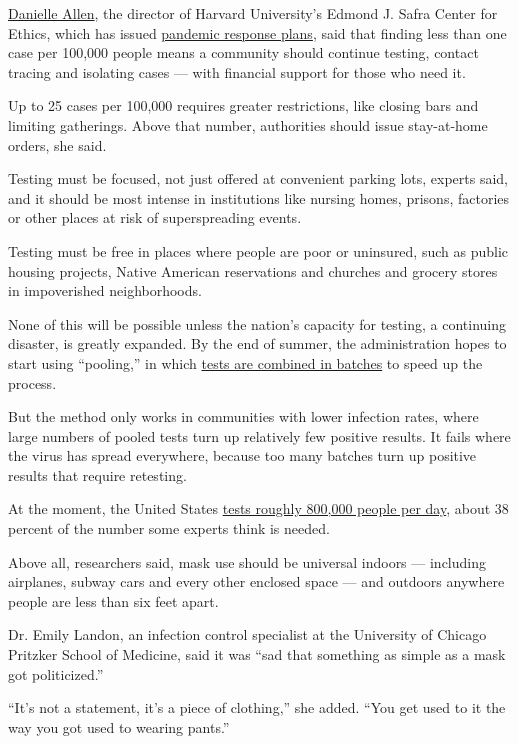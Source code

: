 \href{https://scholar.harvard.edu/danielleallen/home}{Danielle Allen},
the director of Harvard University's Edmond J. Safra Center for Ethics,
which has issued
\href{https://ethics.harvard.edu/news/path-zero-key-metrics}{pandemic
response plans}, said that finding less than one case per 100,000 people
means a community should continue testing, contact tracing and isolating
cases --- with financial support for those who need it.

Up to 25 cases per 100,000 requires greater restrictions, like closing
bars and limiting gatherings. Above that number, authorities should
issue stay-at-home orders, she said.

Testing must be focused, not just offered at convenient parking lots,
experts said, and it should be most intense in institutions like nursing
homes, prisons, factories or other places at risk of superspreading
events.

Testing must be free in places where people are poor or uninsured, such
as public housing projects, Native American reservations and churches
and grocery stores in impoverished neighborhoods.

None of this will be possible unless the nation's capacity for testing,
a continuing disaster, is greatly expanded. By the end of summer, the
administration hopes to start using ``pooling,'' in which
\href{https://www.nytimes.com/2020/07/01/health/coronavirus-pooled-testing.html}{tests
are combined in batches} to speed up the process.

But the method only works in communities with lower infection rates,
where large numbers of pooled tests turn up relatively few positive
results. It fails where the virus has spread everywhere, because too
many batches turn up positive results that require retesting.

At the moment, the United States
\href{https://www.nytimes.com/interactive/2020/us/coronavirus-testing.html}{tests
roughly 800,000 people per day}, about 38 percent of the number some
experts think is needed.

Above all, researchers said, mask use should be universal indoors ---
including airplanes, subway cars and every other enclosed space --- and
outdoors anywhere people are less than six feet apart.

Dr. Emily Landon, an infection control specialist at the University of
Chicago Pritzker School of Medicine, said it was ``sad that something as
simple as a mask got politicized.''

``It's not a statement, it's a piece of clothing,'' she added. ``You get
used to it the way you got used to wearing pants.''


